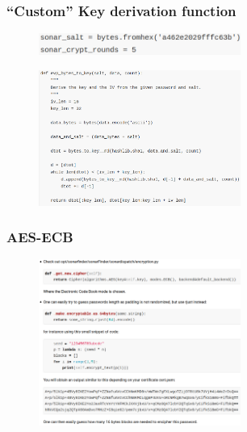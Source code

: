 \begin{frame}[allowframebreaks]
        \frametitle{``Custom'' Key derivation function}
           \begin{figure}[h!]
              \includegraphics[width=250px]{./kdf1.png}
           \end{figure}
           \begin{figure}[h!]
              \includegraphics[width=250px]{./kdf2.png}
           \end{figure}
\end{frame}

\begin{frame}
        \frametitle{AES-ECB}
            \begin{figure}[h!]
              \includegraphics[width=250px]{./ecb.png}
            \end{figure}
\end{frame}
